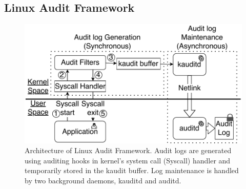 
\subsection{Linux Audit Framework}
\begin{figure}[tbp]
    \centering
    \includegraphics[width=\linewidth]{fig/audit_arch_2.pdf}
    \caption{\label{fig:audit_arch} Architecture of Linux Audit Framework. Audit logs are generated using auditing hooks in kernel's system call (Syscall) handler and temporarily stored in the kaudit buffer. Log maintenance is handled by two background daemons, kauditd and auditd.}
  \end{figure}



